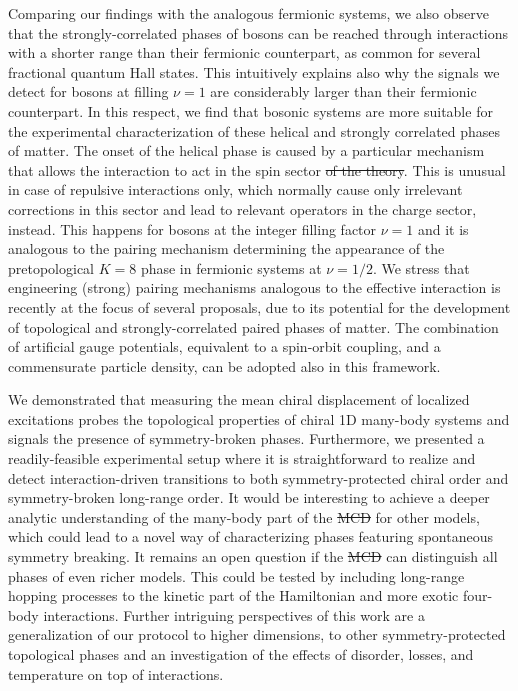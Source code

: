 \documentclass{svmono}
\providecommand{\DIFaddtex}[1]{{\protect\color{blue}\uwave{#1}}} %
\providecommand{\DIFdeltex}[1]{{\protect\color{red}\sout{#1}}}                      %
\providecommand{\DIFaddbegin}{} %
\providecommand{\DIFaddend}{} %
\providecommand{\DIFdelbegin}{} %
\providecommand{\DIFdelend}{} %
\providecommand{\DIFadd}[1]{\texorpdfstring{\DIFaddtex{#1}}{#1}} %
\providecommand{\DIFdel}[1]{\texorpdfstring{\DIFdeltex{#1}}{}} %
\newcommand{\DIFscaledelfig}{0.5}
\newlength{\DIFdelgraphicswidth} %
\newlength{\DIFdelgraphicsheight} %
\newcommand{\DIFaddincludegraphics}[2][]{{\color{blue}\fbox{\DIFOincludegraphics[#1]{#2}}}} %
\newcommand{\DIFdelincludegraphics}[2][]{%
\sbox{\DIFdelgraphicsbox}{\DIFOincludegraphics[#1]{#2}}%
\settoboxwidth{\DIFdelgraphicswidth}{\DIFdelgraphicsbox} %
\settoboxtotalheight{\DIFdelgraphicsheight}{\DIFdelgraphicsbox} %
\scalebox{\DIFscaledelfig}{%
\parbox[b]{\DIFdelgraphicswidth}{\usebox{\DIFdelgraphicsbox}\\[-\baselineskip] \rule{\DIFdelgraphicswidth}{0em}}\llap{\resizebox{\DIFdelgraphicswidth}{\DIFdelgraphicsheight}{%
\setlength{\unitlength}{\DIFdelgraphicswidth}%
\begin{picture}(1,1)%
\thicklines\linethickness{2pt} %
{\color[rgb]{1,0,0}\put(0,0){\framebox(1,1){}}}%
{\color[rgb]{1,0,0}\put(0,0){\line( 1,1){1}}}%
{\color[rgb]{1,0,0}\put(0,1){\line(1,-1){1}}}%
\end{picture}%
}\hspace*{3pt}}} %
} %
\DeclareRobustCommand{\DIFaddbegin}{\DIFOaddbegin \let\includegraphics\DIFaddincludegraphics} %
\DeclareRobustCommand{\DIFaddend}{\DIFOaddend \let\includegraphics\DIFOincludegraphics} %
\DeclareRobustCommand{\DIFdelbegin}{\DIFOdelbegin \let\includegraphics\DIFdelincludegraphics} %
\DeclareRobustCommand{\DIFdelend}{\DIFOaddend \let\includegraphics\DIFOincludegraphics} %
\begin{document}
Comparing our findings with the analogous fermionic systems, we also observe that the strongly-correlated phases of bosons can be reached through interactions with a shorter range than their fermionic counterpart, as common for several fractional quantum Hall states.
This intuitively explains also why the signals we detect for bosons at filling $\nu = 1$ are considerably larger than their fermionic counterpart.
In this respect, we find that bosonic systems are more suitable for the experimental characterization of these helical and strongly correlated phases of matter.
The onset of the helical phase is caused by a particular mechanism that allows the interaction to act in the spin sector \DIFdelbegin \DIFdel{of the theory}\DIFdelend \DIFaddbegin \DIFadd{only}\DIFaddend .
This is unusual in case of repulsive interactions only, which normally cause only irrelevant corrections in this sector and lead to relevant operators in the charge sector, instead.
This happens for bosons at the integer filling factor $\nu=1$ and it is analogous to the pairing mechanism determining the appearance of the pretopological $K = 8$ phase in fermionic systems at $\nu=1/2$.
We stress that engineering (strong) pairing mechanisms analogous to the effective interaction is recently at the focus of several proposals, due to its potential for the development of topological and strongly-correlated paired phases of matter.
The combination of artificial gauge potentials, equivalent to a spin-orbit coupling, and a commensurate particle density, can be adopted also in this framework.

We demonstrated that measuring the mean chiral displacement of localized excitations probes the topological properties of chiral 1D many-body systems and signals the presence of symmetry-broken phases.
Furthermore, we presented a readily-feasible experimental setup where it is straightforward to realize and detect interaction-driven transitions to both symmetry-protected chiral order and symmetry-broken long-range order.
It would be interesting to achieve a deeper analytic understanding of the many-body part of the \DIFdelbegin \DIFdel{MCD }\DIFdelend \DIFaddbegin \DIFadd{mean chiral displacement }\DIFaddend for other models, which could lead to a novel way of characterizing phases featuring spontaneous symmetry breaking.
It remains an open question if the \DIFdelbegin \DIFdel{MCD }\DIFdelend \DIFaddbegin \DIFadd{mean chiral displacement }\DIFaddend can distinguish all phases of even richer models.
This could be tested by including long-range hopping processes to the kinetic part of the Hamiltonian and more exotic four-body interactions.
Further intriguing perspectives of this work are a generalization of our protocol to higher dimensions, to other symmetry-protected topological phases and an investigation of the effects of disorder, losses, and temperature on top of interactions.
\end{document}
